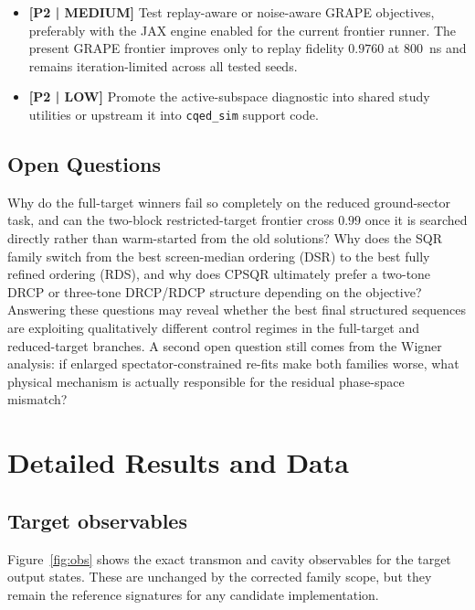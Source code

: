 ﻿\documentclass[aps,pra,twocolumn,reprint,amsmath,amssymb,floatfix]{revtex4-2}
\begin{document}
\begin{itemize}
  validated GRAPE reference so the appendix can compare retained structured and
  pulse-level Wigner functions on the same footing.
  \item \textbf{[P2 | MEDIUM]} Test replay-aware or noise-aware GRAPE
  objectives, preferably with the JAX engine enabled for the current frontier
  runner. The present GRAPE frontier improves only to replay fidelity $0.9760$
  at \SI{800}{ns} and remains iteration-limited across all tested seeds.
  \item \textbf{[P2 | LOW]} Promote the active-subspace diagnostic into shared
  study utilities or upstream it into \texttt{cqed\_sim} support code.
\end{itemize}

\subsection{Open Questions}

Why do the full-target winners fail so completely on the reduced ground-sector
task, and can the two-block restricted-target frontier cross $0.99$ once it is
searched directly rather than warm-started from the old solutions? Why does the
SQR family switch from the best screen-median ordering (DSR) to the best fully
refined ordering (RDS), and why does CPSQR ultimately prefer a two-tone DRCP or
three-tone DRCP/RDCP structure depending on the objective? Answering these
questions may reveal whether the best final structured sequences are exploiting
qualitatively different control regimes in the full-target and reduced-target
branches. A second open question still comes from the Wigner analysis: if
enlarged spectator-constrained re-fits make both families worse, what physical
mechanism is actually responsible for the residual phase-space mismatch?




\appendix

\section{Detailed Results and Data}

\subsection{Target observables}

Figure~\ref{fig:obs} shows the exact transmon and cavity observables for the
target output states. These are unchanged by the corrected family scope, but
they remain the reference signatures for any candidate implementation.
\end{document}
